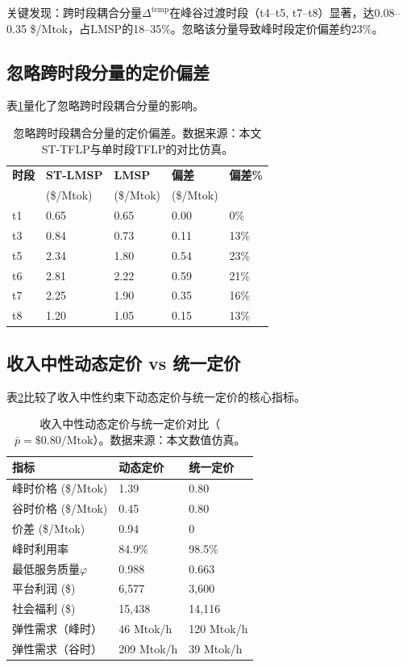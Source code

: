 \documentclass[11pt,a4paper,twocolumn]{article}
\begin{document}
关键发现：跨时段耦合分量$\Delta^{\text{temp}}$在峰谷过渡时段（t4--t5, t7--t8）显著，达0.08--0.35 \$/Mtok，占LMSP的18--35\%。忽略该分量导致峰时段定价偏差约23\%。

\subsection{忽略跨时段分量的定价偏差}

表\ref{tab:temp_bias}量化了忽略跨时段耦合分量的影响。

\begin{table}[htbp]
\centering
\caption{忽略跨时段耦合分量的定价偏差。数据来源：本文ST-TFLP与单时段TFLP的对比仿真。}
\label{tab:temp_bias}
\scriptsize
\begin{tabular}{p{0.8cm}p{1.2cm}p{1.2cm}p{1.2cm}p{1.2cm}}
\toprule
\textbf{时段} & \textbf{ST-LMSP} & \textbf{LMSP} & \textbf{偏差} & \textbf{偏差\%} \\
 & (\$/Mtok) & (\$/Mtok) & (\$/Mtok) & \\
\midrule
t1 & 0.65 & 0.65 & 0.00 & 0\% \\
t3 & 0.84 & 0.73 & 0.11 & 13\% \\
t5 & 2.34 & 1.80 & 0.54 & 23\% \\
t6 & 2.81 & 2.22 & 0.59 & 21\% \\
t7 & 2.25 & 1.90 & 0.35 & 16\% \\
t8 & 1.20 & 1.05 & 0.15 & 13\% \\
\bottomrule
\end{tabular}
\end{table}

\subsection{收入中性动态定价 vs 统一定价}

表\ref{tab:pricing_comparison}比较了收入中性约束下动态定价与统一定价的核心指标。

\begin{table}[htbp]
\centering
\caption{收入中性动态定价与统一定价对比（$\bar{p} = \$0.80/\text{Mtok}$）。数据来源：本文数值仿真。}
\label{tab:pricing_comparison}
\scriptsize
\begin{tabular}{p{2.5cm}p{2cm}p{2cm}}
\toprule
\textbf{指标} & \textbf{动态定价} & \textbf{统一定价} \\
\midrule
峰时价格 (\$/Mtok) & 1.39 & 0.80 \\
谷时价格 (\$/Mtok) & 0.45 & 0.80 \\
价差 (\$/Mtok) & 0.94 & 0 \\
\midrule
峰时利用率 & 84.9\% & 98.5\% \\
最低服务质量$\varphi$ & 0.988 & 0.663 \\
\midrule
平台利润 (\$) & 6,577 & 3,600 \\
社会福利 (\$) & 15,438 & 14,116 \\
\midrule
弹性需求（峰时） & 46 Mtok/h & 120 Mtok/h \\
弹性需求（谷时） & 209 Mtok/h & 39 Mtok/h \\
\bottomrule
\end{tabular}
\end{table}
\end{document}
